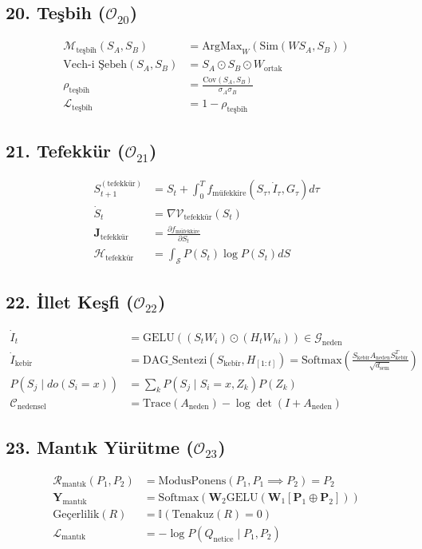 \documentclass[11pt, a4paper]{article}
\begin{document}
\subsection{20. Teşbih ($\mathcal{O}_{20}$)}
\begin{align}
\mathcal{M}_{\text{teşbih}}(S_A, S_B) &= \text{ArgMax}_{W} \left( \text{Sim}(W S_A, S_B) \right) \\
\text{Vech-i Şebeh}(S_A, S_B) &= S_A \odot S_B \odot W_{\text{ortak}} \\
\rho_{\text{teşbih}} &= \frac{\text{Cov}(S_A, S_B)}{\sigma_A \sigma_B} \\
\mathcal{L}_{\text{teşbih}} &= 1 - \rho_{\text{teşbih}}
\end{align}

\subsection{21. Tefekkür ($\mathcal{O}_{21}$)}
\begin{align}
S_{t+1}^{(\text{tefekkür})} &= S_t + \int_{0}^T f_{\text{müfekkire}}(S_\tau, \dot{I}_\tau, G_\tau) d\tau \\
\dot{S}_t &= \nabla \mathcal{V}_{\text{tefekkür}}(S_t) \\
\mathbf{J}_{\text{tefekkür}} &= \frac{\partial f_{\text{müfekkire}}}{\partial S_t} \\
\mathcal{H}_{\text{tefekkür}} &= \int_{\mathcal{S}} P(S_t) \log P(S_t) dS
\end{align}

\subsection{22. İllet Keşfi ($\mathcal{O}_{22}$)}
\begin{align}
\dot{I}_t &= \text{GELU}\left( (S_t W_i) \odot (H_t W_{hi}) \right) \in \mathcal{G}_{\text{neden}} \\
\dot{I}_{\text{kebîr}} &= \text{DAG\_Sentezi}(S_{\text{kebîr}}, H_{[1:t]}) = \text{Softmax}\left( \frac{S_{\text{kebîr}} A_{\text{neden}} S_{\text{kebîr}}^T}{\sqrt{d_{\text{sem}}}} \right) \\
P(S_j \mid do(S_i = x)) &= \sum_k P(S_j \mid S_i=x, Z_k) P(Z_k) \\
\mathcal{C}_{\text{nedensel}} &= \text{Trace}(A_{\text{neden}}) - \log \det(I + A_{\text{neden}})
\end{align}

\subsection{23. Mantık Yürütme ($\mathcal{O}_{23}$)}
\begin{align}
\mathcal{R}_{\text{mantık}}(P_1, P_2) &= \text{ModusPonens}(P_1, P_1 \implies P_2) = P_2 \\
\mathbf{Y}_{\text{mantık}} &= \text{Softmax}\left( \mathbf{W}_2 \text{GELU}(\mathbf{W}_1 [\mathbf{P}_1 \oplus \mathbf{P}_2]) \right) \\
\text{Geçerlilik}(R) &= \mathbb{I}(\text{Tenakuz}(R) = 0) \\
\mathcal{L}_{\text{mantık}} &= -\log P(Q_{\text{netice}} \mid P_1, P_2)
\end{align}
\end{document}
